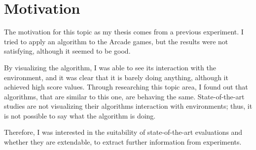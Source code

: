 \chapter{Motivation}
The motivation for this topic as my thesis comes from a previous experiment. I tried to apply an algorithm to the Arcade games, but the results were not satisfying, although it seemed to be good.

By visualizing the algorithm, I was able to see its interaction with the environment, and it was clear that it is barely doing anything, although it achieved high score values. Through researching this topic area, I found out that algorithms, that are similar to this one, are behaving the same. State-of-the-art studies are not visualizing their algorithms interaction with environments; thus, it is not possible to say what the algorithm is doing.

Therefore, I was interested in the suitability of state-of-the-art evaluations and whether they are extendable, to extract further information from experiments.

